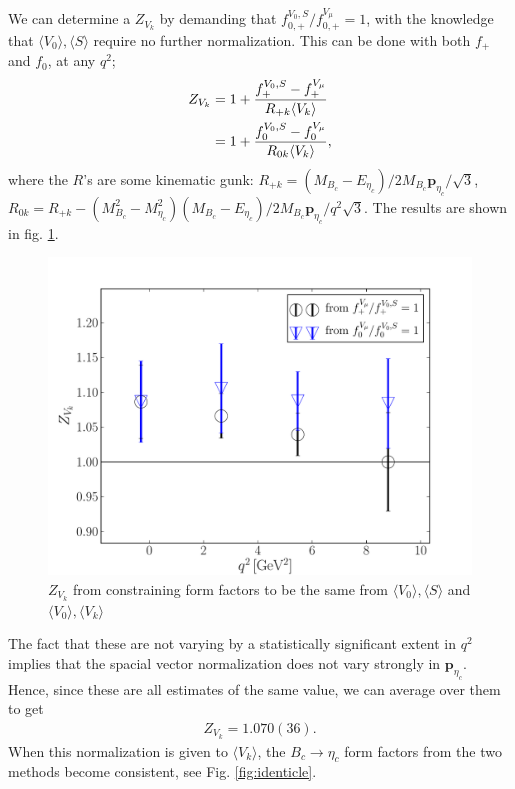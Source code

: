 We can determine a $Z_{V_k}$ by demanding that $f_{0,+}^{V_0,S}/f_{0,+}^{V_{\mu}}=1$, with the knowledge that $\langle V_0 \rangle, \langle S \rangle$ require no further normalization. This can be done with both $f_+$ and $f_0$, at any $q^2$;
\begin{align}
	Z_{V_k} &= 1 + {f_+^{V_0,S} - f_+^{V_{\mu}} \over R_{+k} \langle V_k \rangle }  \\
	&= 1 + {f_0^{V_0,S} - f_0^{V_{\mu}} \over R_{0k} \langle V_k \rangle },
\end{align}
where the $R$'s are some kinematic gunk: $R_{+k} = ( M_{B_c} - E_{\eta_c} )/2M_{B_c}{\textbf{p}}_{\eta_c}/\sqrt{3}$, \\ $R_{0k} = R_{+k} - {( M_{B_c}^2-M_{\eta_c}^2 )(M_{B_c}-E_{\eta_c})/2M_{B_c} {\textbf{p}}_{\eta_c}/q^2\sqrt{3}}$. The results are shown in fig. \ref{fig:ZVk}.
\begin{figure}[htb!]
\centering
\includegraphics[scale=0.5]{images/nrqcd/ZVk.pdf}
\caption{$Z_{V_k}$ from constraining form factors to be the same from $\langle V_0 \rangle,\langle S \rangle$ and $\langle V_0 \rangle,\langle V_k \rangle$}
\label{fig:ZVk}
\end{figure}
The fact that these are not varying by a statistically significant extent in $q^2$ implies that the spacial vector normalization does not vary strongly in ${\textbf{p}}_{\eta_c}$. Hence, since these are all estimates of the same value, we can average over them to get
\begin{align}
	Z_{V_k} = 1.070(36).
\end{align}
When this normalization is given to $\langle V_k \rangle$, the $B_c\to\eta_c$ form factors from the two methods become consistent, see Fig. \ref{fig:identicle}.

